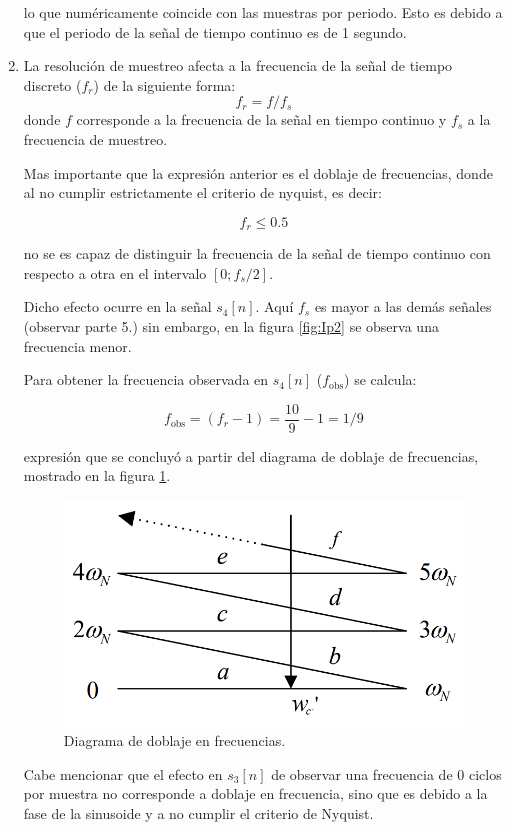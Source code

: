 \begin{enumerate}
    lo que numéricamente coincide con las muestras por periodo. Esto es debido a que el periodo de la señal de tiempo continuo es de 1 segundo.
    
    \item La resolución de muestreo afecta a la frecuencia de la señal de tiempo discreto ($f_r$) de la siguiente forma:
    $$ f_r = f/f_s$$
    donde $f$ corresponde a la frecuencia de la señal en tiempo continuo y $f_s$ a la frecuencia de muestreo.
    
    Mas importante que la expresión anterior es el doblaje de frecuencias, donde al no cumplir estrictamente el criterio de nyquist, es decir:
    
    $$ f_r \leq 0.5$$
    
    no se es capaz de distinguir la frecuencia de la señal de tiempo continuo con respecto a otra en el intervalo $[0 ; f_s/2]$.
    
    Dicho efecto ocurre en la señal $s_4[n]$. Aquí $f_s$ es mayor a las demás señales (observar parte 5.) sin embargo, en la figura \ref{fig:Ip2} se observa una frecuencia menor. 
    
    Para obtener la frecuencia observada en $s_4[n]$ ($f_{\text{obs}}$) se calcula:
    
    $$ f_{\text{obs}} = (f_r - 1) = \dfrac{10}{9}-1 = 1/9 $$
    
    expresión que se concluyó a partir del diagrama de doblaje de frecuencias, mostrado en la figura \ref{fig:Ip2df}.
    
    \begin{figure}[H]
        \centering
        \includegraphics[width = .6 \linewidth]{Imagenes/Ip2_df.png}
        \caption{Diagrama de doblaje en frecuencias.}
        \label{fig:Ip2df}
    \end{figure}
    
    Cabe mencionar que el efecto en $s_3[n]$ de observar una frecuencia de 0 ciclos por muestra no corresponde a doblaje en frecuencia, sino que es debido a la fase de la sinusoide y a no cumplir el criterio de Nyquist.
    
    
    

    
\end{enumerate}



